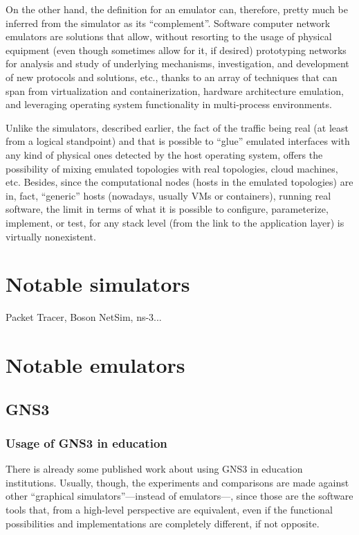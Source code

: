 On the other hand, the definition for an emulator can, therefore, pretty much be inferred from the simulator as its ``complement''.
Software computer network emulators are solutions that allow, without resorting to the usage of physical equipment (even though sometimes allow for it, if desired) prototyping networks for analysis and study of underlying mechanisms, investigation, and development of new protocols and solutions, etc., thanks to an array of techniques that can span from virtualization and containerization, hardware architecture emulation, and leveraging operating system functionality in multi-process environments.

Unlike the simulators, described earlier, the fact of the traffic being real (at least from a logical standpoint) and that is possible to ``glue'' emulated interfaces with any kind of physical ones detected by the host operating system, offers the possibility of mixing emulated topologies with real topologies, cloud machines, etc.
Besides, since the computational nodes (hosts in the emulated topologies) are in, fact, ``generic'' hosts (nowadays, usually VMs or containers), running real software, the limit in terms of what it is possible to configure, parameterize, implement, or test, for any stack level (from the link to the application layer) is virtually nonexistent.

\section{Notable simulators}
\label{sec:notablsimulators}

Packet Tracer, Boson NetSim, ns-3...

\section{Notable emulators}
\label{sec:notablemulators}

\subsection{GNS3}
\label{subsec:relworkgns3}

\subsubsection{Usage of GNS3 in education}
\label{subsubsec:relgns3usageedu}

There is already some published work about using GNS3 in education institutions.
Usually, though, the experiments and comparisons are made against other ``graphical simulators''---instead of emulators---, since those are the software tools that, from a high-level perspective are equivalent, even if the functional possibilities and implementations are completely different, if not opposite.


